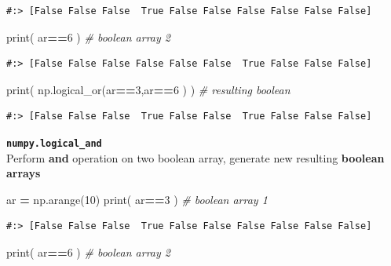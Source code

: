 \documentclass[
]{book}
\newenvironment{Shaded}{\begin{snugshade}}{\end{snugshade}}
\newcommand{\BuiltInTok}[1]{#1}
\newcommand{\CommentTok}[1]{\textcolor[rgb]{0.37,0.37,0.37}{\textit{#1}}}
\newcommand{\DecValTok}[1]{\textcolor[rgb]{0.06,0.06,0.06}{#1}}
\newcommand{\NormalTok}[1]{#1}
\newcommand{\OperatorTok}[1]{\textcolor[rgb]{0.43,0.43,0.43}{\textbf{#1}}}
\begin{document}
\begin{verbatim}
#:> [False False False  True False False False False False False]
\end{verbatim}

\begin{Shaded}
\begin{Highlighting}[]
\BuiltInTok{print}\NormalTok{( ar}\OperatorTok{==}\DecValTok{6}\NormalTok{ )  }\CommentTok{# boolean array 2}
\end{Highlighting}
\end{Shaded}

\begin{verbatim}
#:> [False False False False False False  True False False False]
\end{verbatim}

\begin{Shaded}
\begin{Highlighting}[]
\BuiltInTok{print}\NormalTok{( np.logical_or(ar}\OperatorTok{==}\DecValTok{3}\NormalTok{,ar}\OperatorTok{==}\DecValTok{6}\NormalTok{ ) ) }\CommentTok{# resulting boolean}
\end{Highlighting}
\end{Shaded}

\begin{verbatim}
#:> [False False False  True False False  True False False False]
\end{verbatim}

\textbf{\texttt{numpy.logical\_and}}\\
Perform \textbf{and} operation on two boolean array, generate new resulting \textbf{boolean arrays}

\begin{Shaded}
\begin{Highlighting}[]
\NormalTok{ar }\OperatorTok{=}\NormalTok{ np.arange(}\DecValTok{10}\NormalTok{)}
\BuiltInTok{print}\NormalTok{( ar}\OperatorTok{==}\DecValTok{3}\NormalTok{ ) }\CommentTok{# boolean array 1}
\end{Highlighting}
\end{Shaded}

\begin{verbatim}
#:> [False False False  True False False False False False False]
\end{verbatim}

\begin{Shaded}
\begin{Highlighting}[]
\BuiltInTok{print}\NormalTok{( ar}\OperatorTok{==}\DecValTok{6}\NormalTok{ ) }\CommentTok{# boolean array 2}
\end{Highlighting}
\end{Shaded}
\end{document}
